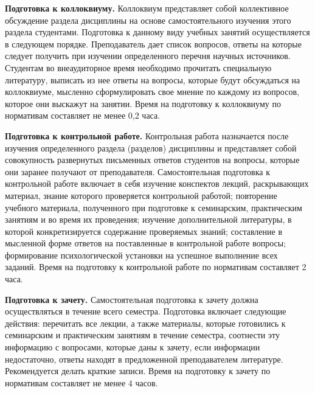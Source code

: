 \documentclass[12pt]{scrartcl}
\renewcommand{\paragraph}[1]{\par\textbf{#1}}
\begin{document}
\paragraph{Подготовка к коллоквиуму.} Коллоквиум представляет собой коллективное
обсуждение раздела дисциплины на основе самостоятельного изучения этого раздела
студентами. Подготовка к данному виду учебных занятий осуществляется в следующем
порядке. Преподаватель дает список вопросов, ответы на которые следует получить при
изучении определенного перечня научных источников. Студентам во внеаудиторное
время необходимо прочитать специальную литературу, выписать из нее ответы на
вопросы, которые будут обсуждаться на коллоквиуме, мысленно сформулировать свое
мнение по каждому из вопросов, которое они выскажут на занятии. Время на подготовку к
коллоквиуму по нормативам составляет не менее 0,2 часа.

\paragraph{Подготовка к контрольной работе.} Контрольная работа назначается после
изучения определенного раздела (разделов) дисциплины и представляет собой
совокупность развернутых письменных ответов студентов на вопросы, которые они
заранее получают от преподавателя. Самостоятельная подготовка к контрольной работе
включает в себя изучение конспектов лекций, раскрывающих материал, знание
которого проверяется контрольной работой; повторение учебного материала, полученного
при подготовке к семинарским, практическим занятиям и во время их проведения;
изучение дополнительной литературы, в которой конкретизируется содержание
проверяемых знаний; составление в мысленной форме ответов на поставленные в
контрольной работе вопросы; формирование психологической установки на успешное
выполнение всех заданий. Время на подготовку к контрольной работе по нормативам
составляет 2 часа.

\paragraph{Подготовка к зачету.} Самостоятельная подготовка к зачету должна
осуществляться в течение всего семестра. Подготовка включает следующие действия:
перечитать все лекции, а также материалы, которые готовились к семинарским и
практическим занятиям в течение семестра, соотнести эту информацию с вопросами,
которые даны к зачету, если информации недостаточно, ответы находят в предложенной
преподавателем литературе. Рекомендуется делать краткие записи. Время на подготовку к
зачету по нормативам составляет не менее 4 часов.
\end{document}
